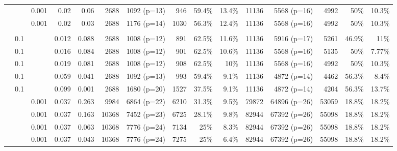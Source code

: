 \begin{table*}[ht]
\begin{tabular}{|l|rrrrrrrrrrrrrr|}
		& \color{red}{0.08} & 0.001 & 0.02 & 0.06 & 2688 & 1092 (p=13) & 946 & 59.4\% & 13.4\% & 11136 & 5568 (p=16) & 4992 & 50\% & 10.3\% \\
		
		& \color{red}{0.05} & 0.001 & 0.02 & 0.03 & 2688 & 1176 (p=14) & 1030 & 56.3\% & 12.4\% & 11136 & 5568 (p=16) & 4992 & 50\% & 10.3\% \\ 
		
		& & & & & & & & & & & & & &\\
		
		& 0.1 & \color{red}{0.0006} & 0.012 & 0.088 & 2688 & 1008 (p=12) & 891 & 62.5\% & 11.6\% & 11136 & 5916 (p=17) & 5261 & 46.9\% & 11\% \\
		
		& 0.1 & \color{red}{0.0008} & 0.016 & 0.084 & 2688 & 1008 (p=12) & 901 & 62.5\% & 10.6\% & 11136 & 5568 (p=16) & 5135 & 50\% & 7.77\% \\
		
		& 0.1 & \color{red}{0.0010} & 0.019 & 0.081 & 2688 & 1008 (p=12) & 908 & 62.5\% & 10\% & 11136 & 5568 (p=16) & 4992 & 50\% & 10.3\% \\
		
		& 0.1 & \color{red}{0.0030} & 0.059 & 0.041 & 2688 &  1092 (p=13) & 993 & 59.4\% & 9.1\% & 11136 & 4872 (p=14) & 4462 & 56.3\% & 8.4\% \\
		
		& 0.1 & \color{red}{0.0050} & 0.099 & 0.001 & 2688 & 1680 (p=20) & 1527 & 37.5\% & 9.1\% & 11136 & 4872 (p=14) & 4204 & 56.3\% & 13.7\% \\
		\cline{1-15}
		\multirow{12}{*}{\rotatebox{90}{aircraft}}
		& \color{red}{0.30} & 0.001 & 0.037 & 0.263 & 9984 & 6864 (p=22) & 6210 & 31.3\% & 9.5\% & 79872 & 64896 (p=26) & 53059 & 18.8\% & 18.2\% \\
		
		& \color{red}{0.20} & 0.001 & 0.037 & 0.163 & 10368 & 7452 (p=23) & 6725 & 28.1\% & 9.8\% & 82944 & 67392 (p=26) & 55098 & 18.8\% & 18.2\% \\
		
		& \color{red}{0.10} & 0.001 & 0.037 & 0.063 & 10368 & 7776 (p=24) & 7134 & 25\% & 8.3\% & 82944 & 67392 (p=26) & 55098 & 18.8\% & 18.2\% \\
		
		& \color{red}{0.08} & 0.001 & 0.037 & 0.043 & 10368 & 7776 (p=24) & 7275 & 25\% & 6.4\% & 82944 & 67392 (p=26) & 55098 & 18.8\% & 18.2\% \\
		

\end{tabular}
\end{table*}
